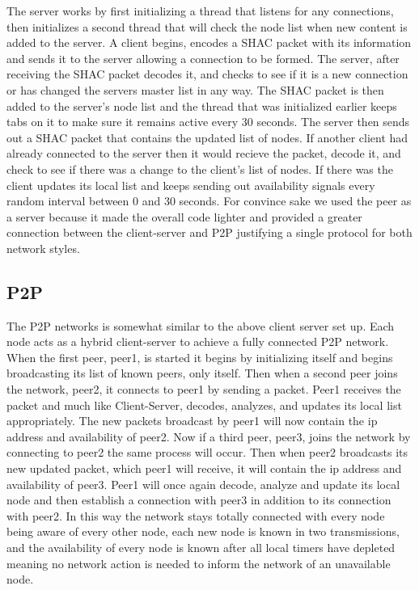 \documentclass[11pt]{article}
\begin{document}
\begin{doublespace}
The server works by first initializing a thread that listens for any connections, then initializes a second thread that will check the node list when new content is added to the server. A client begins, encodes a SHAC packet with its information and sends it to the server allowing a connection to be formed. The server, after receiving the SHAC packet decodes it, and checks to see if it is a new connection or has changed the servers master list in any way. The SHAC packet is then added to the server's node list and the thread that was initialized earlier keeps tabs on it to make sure it remains active every 30 seconds. The server then sends out a SHAC packet that contains the updated list of nodes. If another client had already connected to the server then it would recieve the packet, decode it, and check to see if there was a change to the client's list of nodes. If there was the client updates its local list and keeps sending out availability signals every random interval between 0 and 30 seconds. For convince sake we used the peer as a server because it made the overall code lighter and provided a greater connection between the client-server and P2P justifying a single protocol for both network styles. 

\subsection{P2P}

The P2P networks is somewhat similar to the above client server set up. Each node acts as a hybrid client-server to achieve a fully connected P2P network. When the first peer, peer1, is started it begins by initializing itself and begins broadcasting its list of known peers, only itself. Then when a second peer joins the network, peer2, it connects to peer1 by sending a packet. Peer1 receives the packet and much like Client-Server, decodes, analyzes, and updates its local list appropriately. The new packets broadcast by peer1 will now contain the ip address and availability of peer2. Now if a third peer, peer3, joins the network by connecting to peer2 the same process will occur. Then when peer2 broadcasts its new updated packet, which peer1 will receive, it will contain the ip address and availability of peer3. Peer1 will once again decode, analyze and update its local node and then establish a connection with peer3 in addition to its connection with peer2. In this way the network stays totally connected with every node being aware of every other node, each new node is known in two transmissions, and the availability of every node is known after all local timers have depleted meaning no network action is needed to inform the network of an unavailable node.


\end{doublespace}
\end{document}
